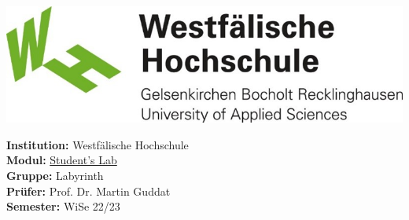 \begin{titlepage}
    \maketitle
    \vspace{2cm}
    \begin{center}
        \includegraphics[width=\paperwidth/2]{../assets/img/whs}
    \end{center}
    \vspace*{\fill}
    \begin{flushleft}
        \Large{\textbf{Institution:} Westfälische Hochschule}\\
        \Large{\textbf{Modul:} \href{https://moodle.w-hs.de/course/view.php?id=36}{Student's Lab}} \\
        \Large{\textbf{Gruppe:} Labyrinth}\\
        \Large{\textbf{Prüfer:} Prof. Dr. Martin Guddat}\\
        \Large{\textbf{Semester:} WiSe 22/23}
    \end{flushleft}
\end{titlepage}
